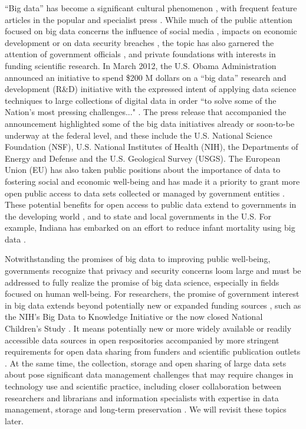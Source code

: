\documentclass[letterpaper,man,apacite]{apa6}
\begin{document}
``Big data'' has become a significant cultural phenomenon \cite{borgman_big_2015}, with frequent feature articles in the popular \cite{lohr_big_2012, Marcus2013} and specialist press \cite{HBR2015, Press2013a}.
While much of the public attention focused on big data concerns the influence of social media \cite{meyer_everything_2014}, impacts on economic development \cite{HBR2015} or on data security breaches \cite{Vinton2015}, the topic has also garnered the attention of government officials \cite{NSFBigData}, and private foundations \cite{ArnoldFdnEvidence, GatesFdn, MooreFdn} with interests in funding scientific research.
In March 2012, the U.S. Obama Administration announced an initiative to spend \$200 M dollars on a ``big data'' research and development (R\&D) initiative \cite{Gianchandani2012, Obama2012} with the expressed intent of applying data science techniques to large collections of digital data in order ``to solve some of the Nation's most pressing challenges..." \cite{Obama2012}.
The press release that accompanied the announcement \cite{Obama2012} highlighted some of the big data initiatives already or soon-to-be underway at the federal level, and these include the U.S. National Science Foundation (NSF), U.S. National Institutes of Health (NIH), the Departments of Energy and Defense and the U.S. Geological Survey (USGS).
The European Union (EU) has also taken public positions \cite{EU2013} about the importance of data to fostering social and economic well-being and has made it a priority to grant more open public access to data sets collected or managed by government entities \cite{EU2015}.
These potential benefits for open access to public data extend to governments in the developing world \cite{Malik2015}, and to state and local governments in the U.S.
For example, Indiana has embarked on an effort to reduce infant mortality using big data \cite{Ravindranath2014}.

Notwithstanding the promises of big data to improving public well-being, governments recognize that privacy and security concerns loom large \cite{Obama2014, Vinton2015} and must be addressed to fully realize the promise of big data science, especially in fields focused on human well-being.
For researchers, the promise of government interest in big data extends beyond potentially new or expanded funding sources \cite{NSFBigData}, such as the NIH's Big Data to Knowledge Initiative \cite{BD2K2015} or the now closed National Children's Study \cite{NCS2015}.
It means potentially new or more widely available or readily accessible data sources in open respositories \cite{databrary.org, dataverse.org, ICSPR, macwhinney_childes_2001} accompanied by more stringent requirements for open data sharing from funders \cite{NIMH2015, NSF2011, GatesFdn} and scientific publication outlets \cite{nosek_promoting_2015}.
At the same time, the collection, storage and open sharing of large data sets about pose significant data management challenges that may require changes in technology use \cite{ProjectJupyter, osf} and scientific practice, including closer collaboration between researchers and librarians and information specialists with expertise in data management, storage and long-term preservation \cite{gordon_researcher-library_2015, lynch_big_2008}.
We will revisit these topics later.
\end{document}
